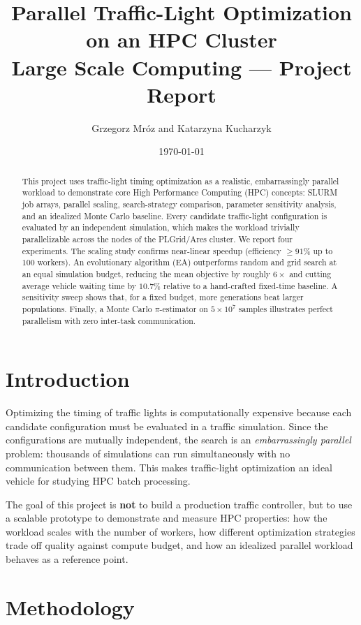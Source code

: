\documentclass[11pt,a4paper]{article}
\title{\textbf{Parallel Traffic-Light Optimization on an HPC Cluster}\\
\large Large Scale Computing --- Project Report}
\author{Grzegorz Mróz and Katarzyna Kucharzyk}
\date{\today}
\begin{document}
\maketitle

\begin{abstract}
This project uses traffic-light timing optimization as a realistic, embarrassingly
parallel workload to demonstrate core High Performance Computing (HPC) concepts:
SLURM job arrays, parallel scaling, search-strategy comparison, parameter
sensitivity analysis, and an idealized Monte Carlo baseline. Every candidate
traffic-light configuration is evaluated by an independent simulation, which makes
the workload trivially parallelizable across the nodes of the PLGrid/Ares cluster.
We report four experiments. The scaling study confirms near-linear speedup
(efficiency $\geq 91\%$ up to $100$ workers). An evolutionary algorithm (EA)
outperforms random and grid search at an equal simulation budget, reducing the
mean objective by roughly $6\times$ and cutting average vehicle waiting time by
$10.7\%$ relative to a hand-crafted fixed-time baseline. A sensitivity sweep shows that, for a fixed
budget, more generations beat larger populations. Finally, a Monte Carlo
$\pi$-estimator on $5\times10^{7}$ samples illustrates perfect parallelism with
zero inter-task communication.
\end{abstract}

\section{Introduction}

Optimizing the timing of traffic lights is computationally expensive because each
candidate configuration must be evaluated in a traffic simulation. Since the
configurations are mutually independent, the search is an \emph{embarrassingly
parallel} problem: thousands of simulations can run simultaneously with no
communication between them. This makes traffic-light optimization an ideal
vehicle for studying HPC batch processing.

The goal of this project is \textbf{not} to build a production traffic controller,
but to use a scalable prototype to demonstrate and measure HPC properties:
how the workload scales with the number of workers, how different optimization
strategies trade off quality against compute budget, and how an idealized parallel
workload behaves as a reference point.

\section{Methodology}
\end{document}
